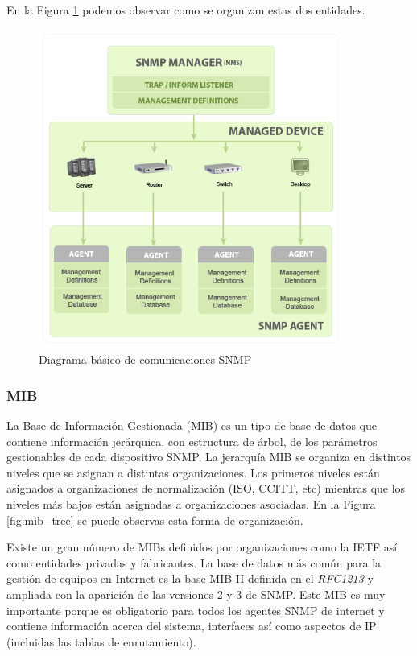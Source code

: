 En la Figura \ref{fig:diagrama_comunicaciones_snmp} podemos observar como se organizan estas dos
entidades. 

\begin{figure}[ht]
    \centering
    \includegraphics[width=10cm]{graphics/snmp-components}
    \caption{Diagrama básico de comunicaciones SNMP}
    \label{fig:diagrama_comunicaciones_snmp}
\end{figure}

\subsubsection{\gls{MIB}}
La Base de Información Gestionada (\gls{MIB}) es un tipo de base de datos que contiene información
jerárquica, con estructura de árbol, de los parámetros gestionables de cada dispositivo SNMP. La
jerarquía MIB se organiza en distintos niveles que se asignan a distintas organizaciones. Los 
primeros niveles están asignados a organizaciones de normalización (ISO, CCITT, etc) mientras que 
los niveles más bajos están asignadas a organizaciones asociadas. En la Figura \ref{fig:mib_tree} 
se puede observas esta forma de organización.


Existe un gran número de MIBs definidos por organizaciones como la \gls{IETF} así como entidades
privadas y fabricantes. La base de datos más común para la gestión de equipos en Internet es la base
MIB-II definida en el \textit{RFC1213} y ampliada con la aparición de las versiones 2 y 3 de SNMP. 
Este MIB es muy importante porque es obligatorio para todos los agentes SNMP de internet y contiene
información acerca del sistema, interfaces así como aspectos de IP (incluidas las tablas de
enrutamiento).


